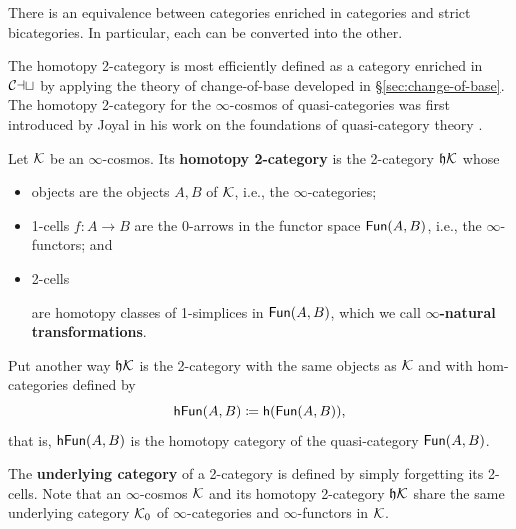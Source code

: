 \begin{proposition}\label{prop:2-cat-as-cat-enriched} There is an equivalence between categories enriched in categories and strict bicategories. In particular, each can be converted into the other.
\end{proposition}

The homotopy 2-category is most efficiently defined as a category enriched in ${\mathord{\mathcal{Cat}}}$ by applying the theory of change-of-base developed in \S\ref{sec:change-of-base}. The homotopy 2-category for the $\infty$-cosmos of quasi-categories was first introduced by Joyal in his work on the foundations of quasi-category theory \cite{Joyal:2008tq}.

\begin{definition}\label{defn:homotopy-2-cat}
   Let ${\mathord{\mathcal{K}}}$ be an $\infty$-cosmos. Its \textbf{homotopy 2-category} is the 2-category $\mathfrak{h}{\mathord{\mathcal{K}}}$ whose
\begin{itemize}
\item objects are the objects $A, B$ of ${\mathord{\mathcal{K}}}$, i.e., the $\infty$-categories;\item 1-cells $f \colon A \to B$ are the 0-arrows in the functor space ${\mathord{\mathsf{Fun}}}(A,B)$, i.e., the $\infty$-functors; and
\item 2-cells
\begin{center}
\end{center}
 are homotopy classes of 1-simplices in ${\mathord{\mathsf{Fun}}}(A,B)$, which we call \textbf{$\infty$-natural transformations}.
\end{itemize}
Put another way $\mathfrak{h}{\mathord{\mathcal{K}}}$ is the 2-category with the same objects as ${\mathord{\mathcal{K}}}$ and with hom-categories defined by
\[ {\mathord{\mathsf{hFun}}}(A,B)   \coloneq {\mathord{\mathsf{h}}}({\mathord{\mathsf{Fun}}}(A,B)),\]
that is, ${\mathord{\mathsf{hFun}}}(A,B)$ is the homotopy category of the quasi-category ${\mathord{\mathsf{Fun}}}(A,B)$.
\end{definition}

\begin{definition}\label{defn:underlying-cat-of-2cat}
The \textbf{underlying category} of a 2-category is defined by simply forgetting its 2-cells. Note that an $\infty$-cosmos ${\mathord{\mathcal{K}}}$ and its homotopy 2-category $\mathfrak{h}{\mathord{\mathcal{K}}}$ share the same underlying category ${\mathord{\mathcal{K}}}_0$ of $\infty$-categories and $\infty$-functors in ${\mathord{\mathcal{K}}}$.
\end{definition}


